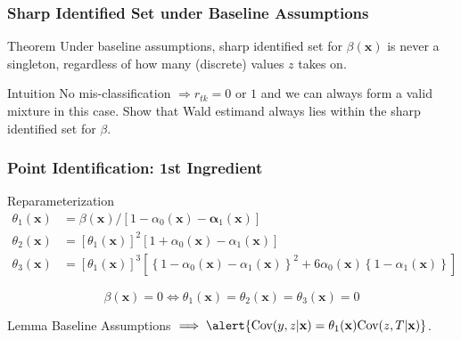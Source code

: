 \documentclass[handout]{beamer}
\begin{document}
\begin{frame}
  \frametitle{Sharp Identified Set under Baseline Assumptions}

  \begin{alertblock}{Theorem}
    Under baseline assumptions, sharp identified set for $\beta(\mathbf{x})$ is never a singleton, regardless of how many (discrete) values $z$ takes on.
  \end{alertblock}

  \begin{block}{Intuition}
    No mis-classification $\Rightarrow r_{tk} = 0 \mbox{ or } 1$ and we can always form a valid mixture in this case. Show that Wald estimand always lies within the sharp identified set for $\beta$. 
  \end{block}



\end{frame}
\begin{frame}
  \frametitle{Point Identification: 1st Ingredient}


  \vspace{-1em}

  \begin{block}{Reparameterization}
    \vspace{-1em}
\begin{align*}
  \theta_1(\mathbf{x}) &= \beta(\mathbf{x})/\left[ 1 - \alpha_0(\mathbf{x}) - \mathbf{\alpha}_1(\mathbf{x})  \right]\\
  \theta_2(\mathbf{x}) &= \left[\theta_1(\mathbf{x})\right]^2 \left[ 1 + \alpha_0(\mathbf{x}) - \alpha_1(\mathbf{x})\right] \\
  \theta_3(\mathbf{x}) &= \left[\theta_1(\mathbf{x})\right]^3\left[ \left\{ 1 - \alpha_0(\mathbf{x}) - \alpha_1(\mathbf{x}) \right\}^2 + 6\alpha_0(\mathbf{x})\left\{ 1 - \alpha_1(\mathbf{x}) \right\} \right]
\end{align*}

\[\boxed{\beta(\mathbf{x}) = 0 \iff \theta_1(\mathbf{x}) = \theta_2(\mathbf{x}) = \theta_3(\mathbf{x}) = 0}\]
  \end{block}

  \vspace{-1.5em}

  \begin{block}{Lemma}
    Baseline Assumptions $\implies \alert{\mbox{Cov}(y,z|\mathbf{x}) = \theta_1(\mathbf{x}) \mbox{Cov}(z,T|\mathbf{x})}$.
  \end{block}

\end{frame}
\end{document}
